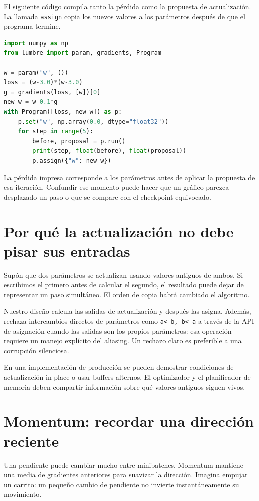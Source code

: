 \documentclass[12pt,a4paper,oneside]{report}
\begin{document}
El siguiente código compila tanto la pérdida como la propuesta de actualización. La llamada \texttt{assign} copia los nuevos valores a los parámetros después de que el programa termine.

\begin{lstlisting}[language=Python]
import numpy as np
from lumbre import param, gradients, Program

w = param("w", ())
loss = (w-3.0)*(w-3.0)
g = gradients(loss, [w])[0]
new_w = w-0.1*g
with Program([loss, new_w]) as p:
    p.set("w", np.array(0.0, dtype="float32"))
    for step in range(5):
        before, proposal = p.run()
        print(step, float(before), float(proposal))
        p.assign({"w": new_w})
\end{lstlisting}
La pérdida impresa corresponde a los parámetros antes de aplicar la propuesta de esa iteración. Confundir ese momento puede hacer que un gráfico parezca desplazado un paso o que se compare con el checkpoint equivocado.

\section{Por qué la actualización no debe pisar sus entradas}
Supón que dos parámetros se actualizan usando valores antiguos de ambos. Si escribimos el primero antes de calcular el segundo, el resultado puede dejar de representar un paso simultáneo. El orden de copia habrá cambiado el algoritmo.

Nuestro diseño calcula las salidas de actualización y después las asigna. Además, rechaza intercambios directos de parámetros como \texttt{a<-b, b<-a} a través de la API de asignación cuando las salidas son los propios parámetros: esa operación requiere un manejo explícito del aliasing. Un rechazo claro es preferible a una corrupción silenciosa.

En una implementación de producción se pueden demostrar condiciones de actualización in-place o usar buffers alternos. El optimizador y el planificador de memoria deben compartir información sobre qué valores antiguos siguen vivos.

\section{Momentum: recordar una dirección reciente}
Una pendiente puede cambiar mucho entre minibatches. Momentum mantiene una media de gradientes anteriores para suavizar la dirección. Imagina empujar un carrito: un pequeño cambio de pendiente no invierte instantáneamente su movimiento.
\end{document}
